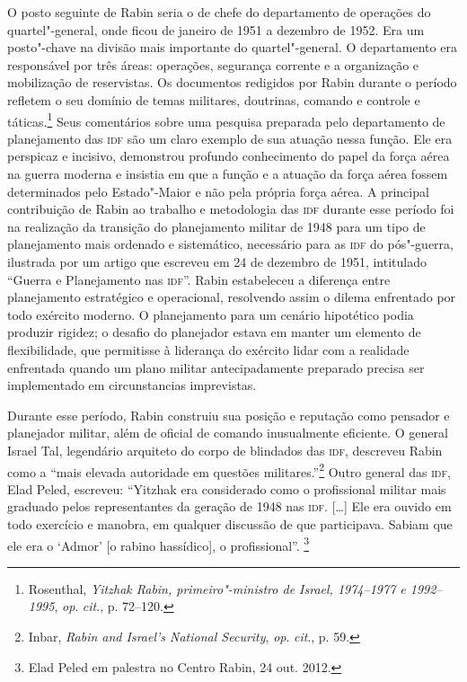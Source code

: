 O posto seguinte de Rabin seria o de chefe do departamento de operações
do quartel"-general, onde ficou de janeiro de 1951 a dezembro de 1952.
Era um posto"-chave na divisão mais importante do quartel"-general. O
departamento era responsável por três áreas: operações, segurança
corrente e a organização e mobilização de reservistas. Os documentos
redigidos por Rabin durante o período refletem o seu domínio de temas
militares, doutrinas, comando e controle e táticas.\footnote{Rosenthal, \textit{Yitzhak Rabin, primeiro"-ministro de Israel, 1974--1977 e 1992--1995}, \textit{op}. \textit{cit}., p. 72--120.} Seus
comentários sobre uma pesquisa preparada pelo departamento de
planejamento das \textsc{idf} são um claro exemplo de sua atuação nessa função.
Ele era perspicaz e incisivo, demonstrou profundo conhecimento do
papel da força aérea na guerra moderna e insistia em que a função e a
atuação da força aérea fossem determinados pelo Estado"-Maior e não pela
própria força aérea. A principal contribuição de Rabin ao trabalho e
metodologia das \textsc{idf} durante esse período foi na realização da transição
do planejamento militar de 1948 para um tipo de planejamento mais
ordenado e sistemático, necessário para as \textsc{idf} do pós"-guerra, ilustrada
por um artigo que escreveu em 24 de dezembro de 1951, intitulado ``Guerra e
Planejamento nas \textsc{idf}''. Rabin estabeleceu a diferença entre planejamento
estratégico e operacional, resolvendo assim o dilema enfrentado por todo
exército moderno. O planejamento para um cenário hipotético podia
produzir rigidez; o desafio do planejador estava em manter um elemento
de flexibilidade, que permitisse à liderança do exército lidar com a
realidade enfrentada quando um plano militar antecipadamente preparado
precisa ser implementado em circunstancias imprevistas.

Durante esse período, Rabin construiu sua posição e reputação como
pensador e planejador militar, além de oficial de comando inusualmente
eficiente. O general Israel Tal, legendário arquiteto do corpo de
blindados das \textsc{idf}, descreveu Rabin como a ``mais elevada autoridade em
questões militares.''\footnote{Inbar, \textit{Rabin and Israel's National Security}, \textit{op}. \textit{cit}., p. 59.} Outro general das \textsc{idf}, Elad Peled,
escreveu: ``Yitzhak era considerado como o profissional militar mais
graduado pelos representantes da geração de 1948 nas \textsc{idf}. {[}\ldots{}{]} Ele era
ouvido em todo exercício e manobra, em qualquer discussão de que
participava. Sabiam que ele era o `Admor' {[}o rabino hassídico{]}, o
profissional''. \footnote{Elad Peled em palestra no Centro Rabin, 24 out. 2012.}


